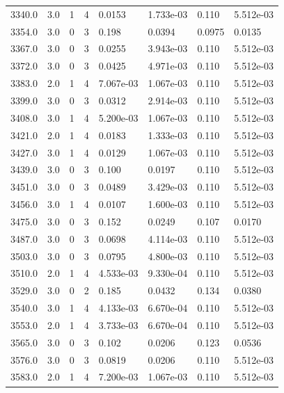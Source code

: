 \documentclass[preview]{standalone}
\begin{document}
{{{{{{{{{\begin{tabular}{L{1.2cm}C{1.2cm} C{0.3cm}C{0.5cm} C{1.4cm}C{1.4cm} C{1.4cm}C{1.4cm}}
  3340.0  &   3.0  & 1     &  4 &  0.0153  & 1.733e-03  & 0.110 &  5.512e-03   \\ 
  3354.0  &   3.0  & 0     &  3 &  0.198  & 0.0394  & 0.0975 &  0.0135   \\ 
  3367.0  &   3.0  & 0     &  3 &  0.0255  & 3.943e-03  & 0.110 &  5.512e-03   \\ 
  3372.0  &   3.0  & 0     &  3 &  0.0425  & 4.971e-03  & 0.110 &  5.512e-03   \\ 
  3383.0  &   2.0  & 1     &  4 &  7.067e-03  & 1.067e-03  & 0.110 &  5.512e-03   \\ 
  3399.0  &   3.0  & 0     &  3 &  0.0312  & 2.914e-03  & 0.110 &  5.512e-03   \\ 
  3408.0  &   3.0  & 1     &  4 &  5.200e-03  & 1.067e-03  & 0.110 &  5.512e-03   \\ 
  3421.0  &   2.0  & 1     &  4 &  0.0183  & 1.333e-03  & 0.110 &  5.512e-03   \\ 
  3427.0  &   3.0  & 1     &  4 &  0.0129  & 1.067e-03  & 0.110 &  5.512e-03   \\ 
  3439.0  &   3.0  & 0     &  3 &  0.100  & 0.0197  & 0.110 &  5.512e-03   \\ 
  3451.0  &   3.0  & 0     &  3 &  0.0489  & 3.429e-03  & 0.110 &  5.512e-03   \\ 
  3456.0  &   3.0  & 1     &  4 &  0.0107  & 1.600e-03  & 0.110 &  5.512e-03   \\ 
  3475.0  &   3.0  & 0     &  3 &  0.152  & 0.0249  & 0.107 &  0.0170   \\ 
  3487.0  &   3.0  & 0     &  3 &  0.0698  & 4.114e-03  & 0.110 &  5.512e-03   \\ 
  3503.0  &   3.0  & 0     &  3 &  0.0795  & 4.800e-03  & 0.110 &  5.512e-03   \\ 
  3510.0  &   2.0  & 1     &  4 &  4.533e-03  & 9.330e-04  & 0.110 &  5.512e-03   \\ 
  3529.0  &   3.0  & 0     &  2 &  0.185  & 0.0432  & 0.134 &  0.0380   \\ 
  3540.0  &   3.0  & 1     &  4 &  4.133e-03  & 6.670e-04  & 0.110 &  5.512e-03   \\ 
  3553.0  &   2.0  & 1     &  4 &  3.733e-03  & 6.670e-04  & 0.110 &  5.512e-03   \\ 
  3565.0  &   3.0  & 0     &  3 &  0.102  & 0.0206  & 0.123 &  0.0536   \\ 
  3576.0  &   3.0  & 0     &  3 &  0.0819  & 0.0206  & 0.110 &  5.512e-03   \\ 
  3583.0  &   2.0  & 1     &  4 &  7.200e-03  & 1.067e-03  & 0.110 &  5.512e-03   \\ 

\end{tabular}}}}}}}}}}
\end{document}
